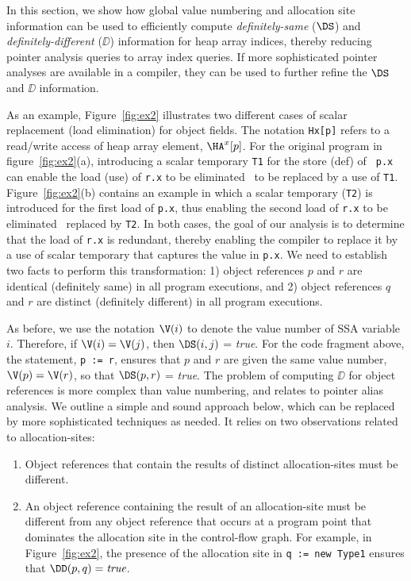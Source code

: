 In this section, we show how global value numbering and allocation
site information can be used to efficiently 
compute
{\it definitely-same} ($\DS$) and {\it definitely-different}
($\DD$) information for 
heap array indices, thereby 
reducing pointer analysis queries to array index queries.
If more sophisticated pointer analyses are available in a compiler,
they can be used to further refine the $\DS$ and $\DD$ information.

As an example, 
Figure~\ref{fig:ex2} illustrates two different cases of scalar
replacement (load elimination) for object fields. 
The notation {\tt Hx[p]} refers to a read/write access of heap array
element, 
$\HA^x[p]$.
For the original program in figure~\ref{fig:ex2}(a),
introducing a scalar temporary {\tt T1} for the store (def) of {\tt
p.x} can enable the load (use) of {\tt r.x} to be eliminated \ie\ to
be replaced by a use of {\tt T1}.  Figure~\ref{fig:ex2}(b)
contains an example in which a scalar temporary ({\tt T2}) is
introduced for the first load of {\tt p.x}, thus enabling the second
load of {\tt r.x} to be eliminated \ie\ replaced by {\tt T2}. 
In both cases, the goal of our analysis is to determine that the load
of {\tt r.x} is redundant, thereby enabling
the compiler to replace it by 
a use of scalar temporary that captures the value in {\tt p.x}.
We need to establish two facts to perform this transformation:
1) object references $p$ and $r$ are identical (definitely same) in 
all program executions, and 2)
object references $q$ and $r$ are distinct (definitely different) in
all program executions. 

As before, we use the notation $\V(i)$ to denote the value number of SSA 
variable $i$.  Therefore, if $\V(i) = \V(j)$, then 
$\DS(i,j)$ = {\it true}.  
For the code fragment above, the  statement, {\tt p~:=~r},
ensures that $p$ and $r$ are given the same value number,
$\V(p) = \V(r)$, so that $\DS(p,r)$ = {\it true}.
The problem of
computing $\DD$ for object references is more complex than value numbering, and relates
to pointer alias analysis.  We outline a simple  and sound approach
below, which can be replaced by more sophisticated techniques as needed.
It relies on two observations related to allocation-sites:
\begin{enumerate}
\item Object references that contain the results of distinct allocation-sites
must be different.
\item An object reference containing the result of an allocation-site
must be different from any object reference 
that occurs at a program point that dominates the allocation site in the control-flow graph.
For example, in Figure~\ref{fig:ex2},
the presence of the allocation site in {\tt q~:=~new~Type1}
ensures that $\DD(p,q) = \mbox{\it true}$.
\end{enumerate}


